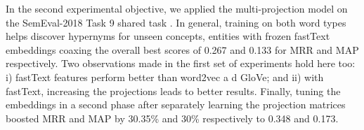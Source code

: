 In the second experimental objective, we applied the multi-projection model on the SemEval-2018 Task 9 shared task \citep{camacho2018semeval}.  In general, training on both word types helps discover hypernyms for unseen concepts, entities with frozen fastText embeddings coaxing the overall best scores of 0.267 and 0.133 for \ac{MRR} and \ac{MAP} respectively.  Two observations made in the first set of experiments hold here too: i) fastText features perform better than word2vec a d GloVe; and ii) with fastText, increasing the projections leads to better results.  Finally, tuning the embeddings in a second phase after separately learning the projection matrices boosted MRR and MAP by 30.35\% and 30\% respectively to 0.348 and 0.173.